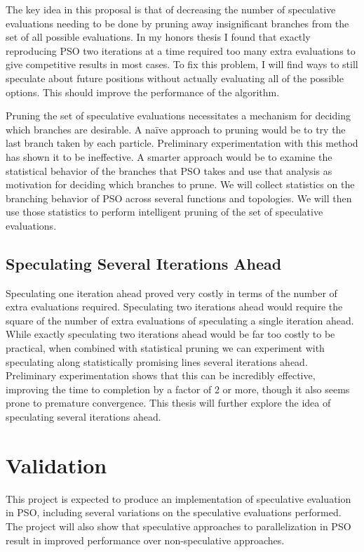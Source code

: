 \documentclass[ms]{byuprop}
\begin{document}
The key idea in this proposal is that of decreasing the number of speculative
evaluations needing to be done by pruning away insignificant branches from the
set of all possible evaluations.  In my honors thesis I found that exactly
reproducing PSO two iterations at a time required too many extra evaluations to
give competitive results in most cases.  To fix this problem, I will find ways
to still speculate about future positions without actually evaluating all of
the possible options.  This should improve the performance of the algorithm.

Pruning the set of speculative evaluations necessitates a mechanism for
deciding which branches are desirable.  A na\"ive approach to pruning would be
to try the last branch taken by each particle.  Preliminary experimentation
with this method has shown it to be ineffective.  A smarter approach would be
to examine the statistical behavior of the branches that PSO takes and use that
analysis as motivation for deciding which branches to prune.  We will collect
statistics on the branching behavior of PSO across several functions and
topologies.  We will then use those statistics to perform intelligent pruning
of the set of speculative evaluations.

\subsection{Speculating Several Iterations Ahead}

Speculating one iteration ahead proved very costly in terms of the number of
extra evaluations required.  Speculating two iterations ahead would require the
square of the number of extra evaluations of speculating a single iteration
ahead.  While exactly speculating two iterations ahead would be far too costly
to be practical, when combined with statistical pruning we can experiment with
speculating along statistically promising lines several iterations ahead.
Preliminary experimentation shows that this can be incredibly effective,
improving the time to completion by a factor of 2 or more, though it also seems
prone to premature convergence.  This thesis will further explore the idea of
speculating several iterations ahead.

\section{Validation}

This project is expected to produce an implementation of speculative evaluation
in PSO, including several variations on the speculative evaluations performed.
The project will also show that speculative approaches to parallelization in
PSO result in improved performance over non-speculative approaches.
\end{document}
